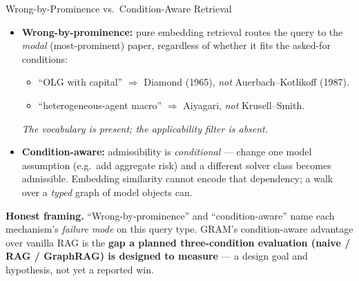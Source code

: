 \begin{frame}{Wrong-by-Prominence vs.\ Condition-Aware Retrieval}
\begin{itemize}
\item \textbf{Wrong-by-prominence:} pure embedding retrieval routes the query to the \emph{modal} (most-prominent) paper, regardless of whether it fits the asked-for conditions:
\begin{itemize}\small
    \item ``OLG with capital'' $\Rightarrow$ Diamond (1965), \emph{not} Auerbach--Kotlikoff (1987).
    \item ``heterogeneous-agent macro'' $\Rightarrow$ Aiyagari, \emph{not} Krusell--Smith.
\end{itemize}
\emph{The vocabulary is present; the applicability filter is absent.}

\medskip
\item \textbf{Condition-aware:} admissibility is \emph{conditional} --- change one model assumption (e.g.\ add aggregate risk) and a different solver class becomes admissible. Embedding similarity cannot encode that dependency; a walk over a \emph{typed} graph of model objects can.
\end{itemize}

\begin{takeawaybox}
\textbf{Honest framing.} ``Wrong-by-prominence'' and ``condition-aware'' name each mechanism's \emph{failure mode} on this query type. GRAM's condition-aware advantage over vanilla RAG is the \textbf{gap a planned three-condition evaluation (naive / RAG / GraphRAG) is designed to measure} --- a design goal and hypothesis, not yet a reported win.
\end{takeawaybox}
\end{frame}

